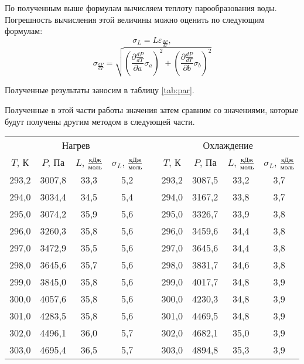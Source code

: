 \documentclass[a4paper,12pt]{article} %
\begin{document}
По полученным выше формулам вычисляем теплоту парообразования воды. Погрешность вычисления этой величины можно оценить по следующим формулам:
\[ \sigma_L = L\varepsilon_{\frac{dP}{dT}}, \]
\[ \sigma_{\frac{dP}{dT}} = \sqrt{\left(\frac{\partial\frac{dP}{dT}}{\partial a}\sigma_a\right)^2+\left(\frac{\partial\frac{dP}{dT}}{\partial b}\sigma_b\right)^2} \]

Полученные результаты заносим в таблицу \ref{tab:par}.

Полученные в этой части работы значения затем сравним со значениями, которые будут получены другим методом в следующей части.

\begin{table}[H]
	\centering
	\begin{tabular}{|c|c|c|c|c|c|c|c|c|}
		\cline{1-4} \cline{6-9}
		\multicolumn{4}{|c|}{Нагрев} &  & \multicolumn{4}{c|}{Охлаждение} \\ \cline{1-4} \cline{6-9} 
		$ T $, К & $ P $, Па & $ L $, $ \frac{\text{кДж}}{\text{моль}} $ & $ \sigma_L $, $ \frac{\text{кДж}}{\text{моль}} $ &  & $ T $, К & $ P $, Па & $ L $, $ \frac{\text{кДж}}{\text{моль}} $ & $ \sigma_L $, $ \frac{\text{кДж}}{\text{моль}} $ \\ \cline{1-4} \cline{6-9} 
		293,2 & 3007,8 & 33,3 & 5,2 &  & 293,2 & 3087,5 & 33,2 & 3,7 \\ \cline{1-4} \cline{6-9} 
		294,0 & 3034,4 & 34,5 & 5,4 &  & 294,0 & 3167,2 & 33,8 & 3,7 \\ \cline{1-4} \cline{6-9} 
		295,0 & 3074,2 & 35,9 & 5,6 &  & 295,0 & 3326,7 & 33,9 & 3,8 \\ \cline{1-4} \cline{6-9} 
		296,0 & 3260,3 & 35,8 & 5,6 &  & 296,0 & 3459,6 & 34,4 & 3,8 \\ \cline{1-4} \cline{6-9} 
		297,0 & 3472,9 & 35,5 & 5,6 &  & 297,0 & 3645,6 & 34,4 & 3,8 \\ \cline{1-4} \cline{6-9} 
		298,0 & 3645,6 & 35,7 & 5,6 &  & 298,0 & 3831,7 & 34,6 & 3,8 \\ \cline{1-4} \cline{6-9} 
		299,0 & 3845,0 & 35,8 & 5,6 &  & 299,0 & 4017,7 & 34,8 & 3,9 \\ \cline{1-4} \cline{6-9} 
		300,0 & 4057,6 & 35,8 & 5,6 &  & 300,0 & 4230,3 & 34,8 & 3,9 \\ \cline{1-4} \cline{6-9} 
		301,0 & 4283,5 & 35,8 & 5,6 &  & 301,0 & 4469,5 & 34,8 & 3,9 \\ \cline{1-4} \cline{6-9} 
		302,0 & 4496,1 & 36,0 & 5,7 &  & 302,0 & 4682,1 & 35,0 & 3,9 \\ \cline{1-4} \cline{6-9} 
		303,0 & 4695,4 & 36,5 & 5,7 &  & 303,0 & 4894,8 & 35,3 & 3,9 \\ \cline{1-4} \cline{6-9} 

\end{tabular}
\end{table}
\end{document}
